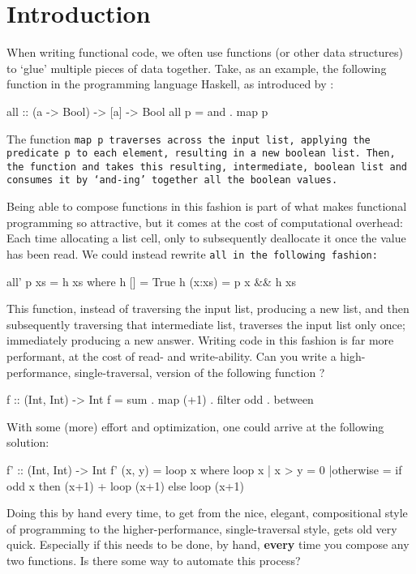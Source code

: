 \section{Introduction}
When writing functional code, we often use functions (or other data structures) to `glue' multiple pieces of data together.
Take, as an example, the following function in the programming language Haskell, as introduced by \cite{Gill1993}: %
\begin{code}
all :: (a -> Bool) -> [a] -> Bool
all p = and . map p
\end{code}
The function \tt{map p} traverses across the input list, applying the predicate \tt{p} to each element, resulting in a new boolean list.
Then, the function \tt{and} takes this resulting, intermediate, boolean list and consumes it by `and-ing' together all the boolean values.

Being able to compose functions in this fashion is part of what makes functional programming so attractive, but it comes at the cost of computational overhead:
Each time allocating a list cell, only to subsequently deallocate it once the value has been read.
We could instead rewrite \tt{all} in the following fashion:
\begin{code}
all' p xs = h xs
  where h []     = True
        h (x:xs) = p x && h xs
\end{code}
This function, instead of traversing the input list, producing a new list, and then subsequently traversing that intermediate list, traverses the input list only once; immediately producing a new answer.
Writing code in this fashion is far more performant, at the cost of read- and write-ability.
Can you write a high-performance, single-traversal, version of the following function \citep{Harper2011}?
\begin{code}
f :: (Int, Int) -> Int
f = sum . map (+1) . filter odd . between
\end{code}
With some (more) effort and optimization, one could arrive at the following solution:
\begin{code}
f' :: (Int, Int) -> Int
f' (x, y) = loop x
  where loop x | x > y    = 0
               |otherwise = if odd x
                             then (x+1) + loop (x+1)
                             else loop (x+1)
\end{code}
Doing this by hand every time, to get from the nice, elegant, compositional style of programming to the higher-performance, single-traversal style, gets old very quick.
Especially if this needs to be done, by hand, \textbf{every} time you compose any two functions.
Is there some way to automate this process?
